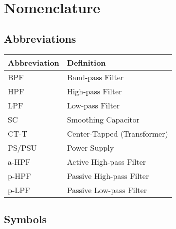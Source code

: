 \chapter*{Nomenclature}
\section*{Abbreviations}

\begin{longtable}{p{2.5cm}p{8cm}}
    \toprule
    Abbreviation & Definition \\
    \midrule\endhead %
    BPF & Band-pass Filter \\
    HPF & High-pass Filter \\
    LPF & Low-pass Filter \\
    SC & Smoothing Capacitor \\
    CT-T & Center-Tapped (Transformer) \\
    PS/PSU & Power Supply \\
    a-HPF & Active High-pass Filter \\
    p-HPF & Passive High-pass Filter \\
    p-LPF & Passive Low-pass Filter \\
    \bottomrule
\end{longtable}

\section*{Symbols}

